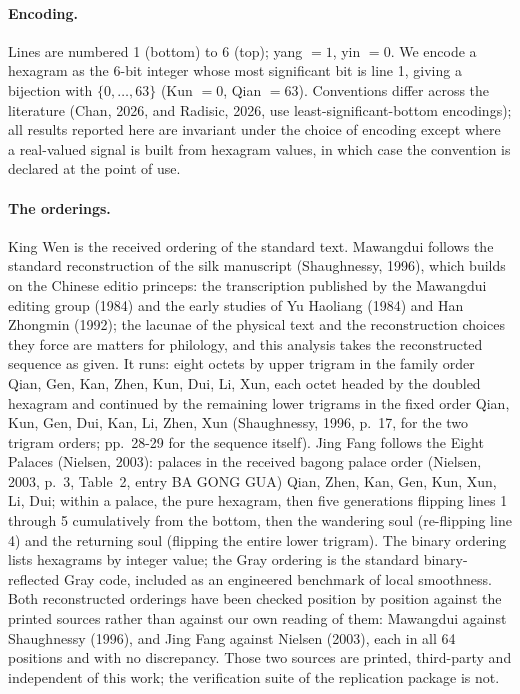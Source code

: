 \documentclass[11pt]{article}
\begin{document}
\paragraph{Encoding.} Lines are numbered 1 (bottom) to 6 (top); yang $= 1$, yin $= 0$. We encode a hexagram as the 6-bit integer whose most significant bit is line 1, giving a bijection with $\{0, \dots, 63\}$ (Kun $= 0$, Qian $= 63$). Conventions differ across the literature (Chan, 2026, and Radisic, 2026, use least-significant-bottom encodings); all results reported here are invariant under the choice of encoding except where a real-valued signal is built from hexagram values, in which case the convention is declared at the point of use.

\paragraph{The orderings.} King Wen is the received ordering of the standard text. Mawangdui follows the standard reconstruction of the silk manuscript (Shaughnessy, 1996), which builds on the Chinese editio princeps: the transcription published by the Mawangdui editing group (1984) and the early studies of Yu Haoliang (1984) and Han Zhongmin (1992); the lacunae of the physical text and the reconstruction choices they force are matters for philology, and this analysis takes the reconstructed sequence as given. It runs: eight octets by upper trigram in the family order Qian, Gen, Kan, Zhen, Kun, Dui, Li, Xun, each octet headed by the doubled hexagram and continued by the remaining lower trigrams in the fixed order Qian, Kun, Gen, Dui, Kan, Li, Zhen, Xun (Shaughnessy, 1996, p.~17, for the two trigram orders; pp.~28-29 for the sequence itself). Jing Fang follows the Eight Palaces (Nielsen, 2003): palaces in the received bagong palace order (Nielsen, 2003, p.~3, Table~2, entry BA GONG GUA) Qian, Zhen, Kan, Gen, Kun, Xun, Li, Dui; within a palace, the pure hexagram, then five generations flipping lines 1 through 5 cumulatively from the bottom, then the wandering soul (re-flipping line 4) and the returning soul (flipping the entire lower trigram). The binary ordering lists hexagrams by integer value; the Gray ordering is the standard binary-reflected Gray code, included as an engineered benchmark of local smoothness. Both reconstructed orderings have been checked position by position against the printed sources rather than against our own reading of them: Mawangdui against Shaughnessy (1996), and Jing Fang against Nielsen (2003), each in all 64 positions and with no discrepancy. Those two sources are printed, third-party and independent of this work; the verification suite of the replication package is not.
\end{document}
